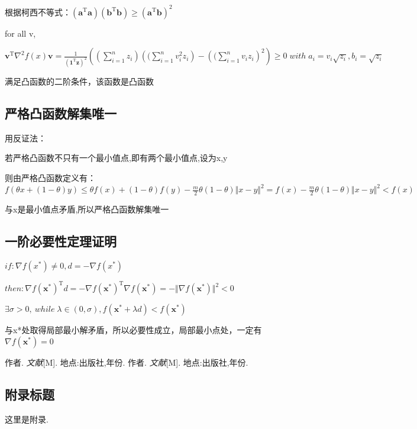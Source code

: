 \documentclass[12pt, a4paper, oneside, fontset=windows]{ctexart}
\begin{document}
根据柯西不等式：$\left ( \mathbf{a}^\mathrm{T}\mathbf{a} \right )\left ( \mathbf{b}^\mathrm{T}\mathbf{b} \right )\geq \left ( \mathbf{a}^\mathrm{T}\mathbf{b} \right )^{2}$

for all v,

$\mathbf{v}^\mathrm{T}\nabla^{2}f(x)\mathbf{v}=\frac{1}{\left ( \mathbf{1}^\mathrm{T}\mathbf{z} \right )^{2}}\left (  \left (\sum_{i=1}^{n}z_{i}\right )\left ( (\sum_{i=1}^{n}v_{i}^{2}z_{i} \right )-\left (  (\sum_{i=1}^{n}v_{i}z_{i}\right )^{2}\right )\geq 0
\; with\; a_{i}=v_{i}\sqrt{z_{i}},b_{i}=\sqrt{z_{i}}$

满足凸函数的二阶条件，该函数是凸函数

\subsection{严格凸函数解集唯一}

用反证法：

若严格凸函数不只有一个最小值点,即有两个最小值点,设为x,y

则由严格凸函数定义有：$f(\theta x+\left (1- \theta \right )y)\leq \theta f(x)+ \left (1- \theta \right )f(y)-\frac{m}{2} \theta\left (1- \theta \right )\Vert x-y \Vert^{2}=f(x)-\frac{m}{2} \theta\left (1- \theta \right )\Vert x-y \Vert^{2}< f(x)$

与x是最小值点矛盾,所以严格凸函数解集唯一

\subsection{一阶必要性定理证明}
$if: \nabla f(x^{*})\neq 0,d=-\nabla f(x^{*})$

$then: \nabla f(\mathbf{x} ^{*})^\mathrm{T}d=-\nabla f(\mathbf{x} ^{*})^\mathrm{T}\nabla f(\mathbf{x} ^{*})=-\Vert \nabla f(\mathbf{x} ^{*}) \Vert^{2}< 0$

$\exists \sigma > 0,\: while\; \lambda \in \left ( 0,\sigma  \right ),f(\mathbf{x} ^{*}+\lambda d)< f(\mathbf{x} ^{*})$

与x*处取得局部最小解矛盾，所以必要性成立，局部最小点处，一定有$\nabla f(\mathbf{x} ^{*})=  0$
\newpage

\begin{thebibliography}{99}
    作者. \emph{文献}[M]. 地点:出版社,年份.
    作者. \emph{文献}[M]. 地点:出版社,年份.
\end{thebibliography}


\newpage

\begin{appendices}
    \renewcommand{\thesection}{\Alph{section}}
    \section{附录标题}
        这里是附录. 
\end{appendices}
\end{document}
